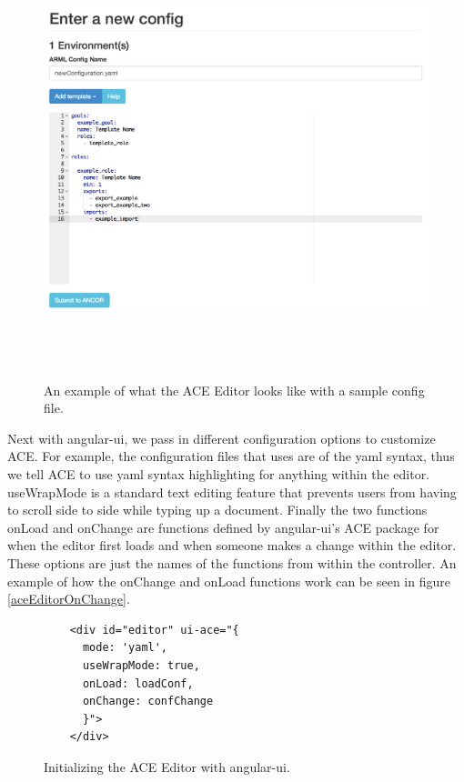\begin{figure}[htb]%

    \includegraphics[height=5.0in]{figures/ace-editor-example.png}

    \caption[ACE Editor example
    ]{An example of what the ACE Editor looks like with a sample config file.}

    \label{aceEditorSample}
\end{figure}

Next with angular-ui, we pass in different configuration options to customize ACE. For example, the configuration files that \ancor{} uses are of the yaml syntax, thus we tell ACE to use yaml syntax highlighting for anything within the editor. useWrapMode is a standard text editing feature that prevents users from having to scroll side to side while typing up a document. Finally the two functions onLoad and onChange are functions defined by angular-ui's ACE package for when the editor first loads and when someone makes a change within the editor. These options are just the names of the functions from within the controller. An example of how the onChange and onLoad functions work can be seen in figure \ref{aceEditorOnChange}.

\begin{figure}[H]
  \begin{center}
    \renewcommand{\theFancyVerbLine}{
      \sffamily\textcolor[rgb]{0.5,0.5,0.5}{\scriptsize\arabic{FancyVerbLine}}}
    \begin{verbatim}
    <div id="editor" ui-ace="{
      mode: 'yaml',
      useWrapMode: true,
      onLoad: loadConf,
      onChange: confChange
      }">
    </div>
    \end{verbatim}

  \end{center}
  \caption{Initializing the ACE Editor with angular-ui.}
  \label{aceEditorHTML}
\end{figure}

